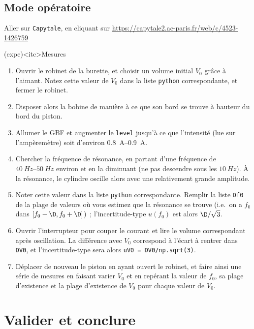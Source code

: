 \documentclass[../main/main.tex]{subfiles}
\begin{document}
\subsection{Mode opératoire}
Aller sur \texttt{Capytale}, en cliquant sur
\url{https://capytale2.ac-paris.fr/web/c/4523-1426759}
\begin{tcb}[breakable](expe)<itc>{Mesures}
	\begin{enumerate}
		\item Ouvrir le robinet de la burette, et choisir un volume initial $V_0$
		      grâce à l'aimant. Notez cette valeur de $V_0$ dans la liste
		      \texttt{python} correspondante, et fermer le robinet.
		\item Disposer alors la bobine de manière à ce que son bord se trouve à
		      hauteur du bord du piston.
		\item Allumer le GBF et augmenter le \texttt{level} jusqu'à ce que
		      l'intensité (lue sur l'ampèremètre) soit d'environ
		      \SIrange{0.8}{0.9}{A}.
		\item Chercher la fréquence de résonance, en partant d'une fréquence de
		      $\SIrange{40}{50}{Hz}$ environ et en la diminuant (ne pas descendre
		      sous les $\SI{10}{Hz}$). À la résonance, le cylindre oscille alors
		      avec une relativement grande amplitude.
		\item Noter cette valeur dans la liste \texttt{python} correspondante.
		      Remplir la liste \texttt{Df0} de la plage de valeurs où vous estimez
		      que la résonance se trouve (i.e.\ on a $f_0$ dans $[f_0 -\D, f_0
					      +\D]$)~; l'incertitude-type $u(f_0)$ est alors $\D/\sqrt{3}$.
		\item Ouvrir l'interrupteur pour couper le courant et lire le volume
		      correspondant après oscillation. La différence avec $V_0$ correspond à
		      l'écart à rentrer dans \texttt{DV0}, et l'incertitude-type sera alors
		      \texttt{uV0 = DV0/np.sqrt(3)}.
		\item Déplacer de nouveau le piston en ayant ouvert le robinet, et faire
		      ainsi une série de mesures en faisant varier $V_0$ et en repérant la
		      valeur de $f_0$, sa plage d'existence et la plage d'existence de $V_0$
		      pour chaque valeur de $V_0$.
	\end{enumerate}
\end{tcb}

\section{Valider et conclure}
\end{document}
